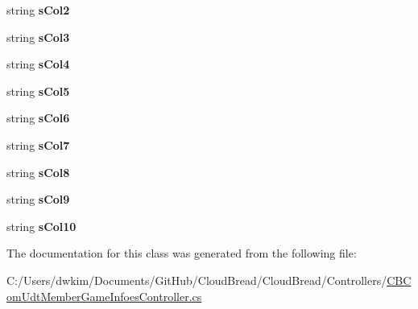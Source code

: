 \begin{DoxyCompactItemize}
\item 
string {\bfseries s\+Col2}\hypertarget{a00099_a197475cb1ebad270b3a711cb00908451}{}\label{a00099_a197475cb1ebad270b3a711cb00908451}

\item 
string {\bfseries s\+Col3}\hypertarget{a00099_aef1f0fdbf5a3c15cab1c53f3583d397d}{}\label{a00099_aef1f0fdbf5a3c15cab1c53f3583d397d}

\item 
string {\bfseries s\+Col4}\hypertarget{a00099_aacd8e645ec251acc7431ec5bbfa5b571}{}\label{a00099_aacd8e645ec251acc7431ec5bbfa5b571}

\item 
string {\bfseries s\+Col5}\hypertarget{a00099_aedb88258b20967b39be49214b5a7c72d}{}\label{a00099_aedb88258b20967b39be49214b5a7c72d}

\item 
string {\bfseries s\+Col6}\hypertarget{a00099_a3a461bd6e04837892c694c52a3389ec0}{}\label{a00099_a3a461bd6e04837892c694c52a3389ec0}

\item 
string {\bfseries s\+Col7}\hypertarget{a00099_a3f316515b99b1fede79a3ebba3419080}{}\label{a00099_a3f316515b99b1fede79a3ebba3419080}

\item 
string {\bfseries s\+Col8}\hypertarget{a00099_a18dd83fc8f7d231c98486829abe9e67e}{}\label{a00099_a18dd83fc8f7d231c98486829abe9e67e}

\item 
string {\bfseries s\+Col9}\hypertarget{a00099_aa819170dca497a06dc2e45156914749b}{}\label{a00099_aa819170dca497a06dc2e45156914749b}

\item 
string {\bfseries s\+Col10}\hypertarget{a00099_a9dbdaa222a6000eb986809afb8dd75a0}{}\label{a00099_a9dbdaa222a6000eb986809afb8dd75a0}

\end{DoxyCompactItemize}


The documentation for this class was generated from the following file\+:\begin{DoxyCompactItemize}
\item 
C\+:/\+Users/dwkim/\+Documents/\+Git\+Hub/\+Cloud\+Bread/\+Cloud\+Bread/\+Controllers/\hyperlink{a00210}{C\+B\+Com\+Udt\+Member\+Game\+Infoes\+Controller.\+cs}\end{DoxyCompactItemize}
